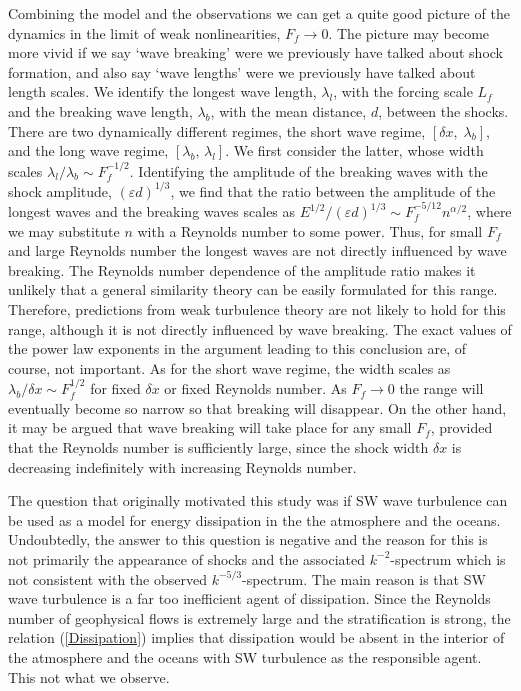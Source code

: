 \documentclass{jfm}
\newcommand{\eps}{\varepsilon}
\begin{document}
Combining the model and the observations we can get a quite good picture of the dynamics in the limit of weak nonlinearities, $ F_{f} \rightarrow  0 $.  
The picture may become more vivid if we say `wave breaking' were we previously have talked about shock formation, and also say
`wave lengths' were we previously have talked about length scales. We identify the longest wave length, $ \lambda_l $,  with the forcing scale $  L_f $ and the breaking wave length, $ \lambda_b $, with the mean distance, $ d $, between the shocks. There are two dynamically different  regimes, the short wave  regime, $ [\delta x, \; \lambda_b] $, and the long wave regime, $ [\lambda_b, \, \lambda_l] $. We first consider the latter, whose width scales  $ \lambda_{l} /\lambda_b \sim F_f^{-1/2} $. Identifying the amplitude of the breaking waves with the shock amplitude, $ (\eps d)^{1/3} $, we find that the ratio between the amplitude of the longest waves and the breaking waves scales as $ E^{1/2}/(\eps d)^{1/3} \sim F_{f}^{-5/12} n^{\alpha/2} $, where we may substitute  $ n $ with a Reynolds number to some power.  Thus, for small $ F_f $ and large Reynolds number the longest waves are not directly influenced by wave breaking. The Reynolds number dependence of the amplitude ratio makes it unlikely that a general similarity theory can be easily formulated for this range. Therefore, predictions from weak turbulence theory \cite[for example][]{ZakharovSagdeev1970}
are not likely to hold for this range, although it is not directly influenced by wave breaking. The exact values of the power law exponents in the argument leading to this conclusion are, of course, not important. As for the short wave regime, the width scales as $  \lambda_b /\delta x \sim F_f^{1/2} $ for fixed $ \delta x $ or fixed Reynolds number. As $ F_{f} \rightarrow 0 $ the range will eventually become so narrow so that breaking will disappear. On the other hand, it may be argued that wave breaking will take place for any small $ F_f $, provided that the Reynolds number is sufficiently large, since the shock width $ \delta x $ is decreasing indefinitely with increasing Reynolds number. 

The question that originally motivated this study was if SW wave turbulence can be used as a model for energy dissipation in the the atmosphere and the oceans. Undoubtedly, the answer to this question is negative and the reason for this is not primarily the appearance of shocks and the associated $ k^{-2} $-spectrum which is not consistent with the observed $ k^{-5/3} $-spectrum. The main reason is that 
SW wave turbulence is  a far too inefficient agent of dissipation. Since the Reynolds number of geophysical flows is extremely large and the stratification is strong, the  relation (\ref{Dissipation}) implies that dissipation would be absent in the interior of the atmosphere and the oceans with SW turbulence as the responsible agent. This not what we observe.
\end{document}
